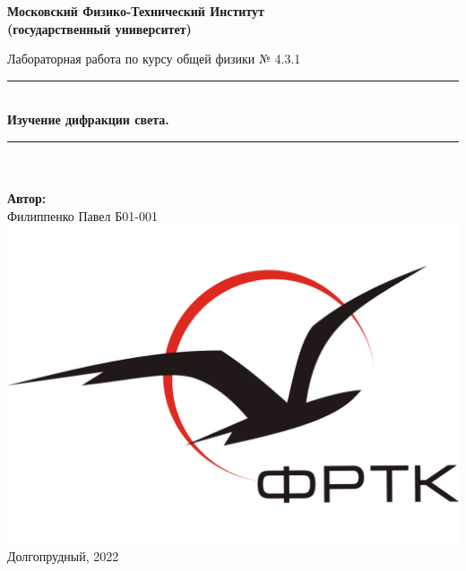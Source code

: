 \newcommand{\HRule}{\rule{\linewidth}{0.7mm}} %
	
	\begin{center}
		\large\textbf{Московский Физико-Технический Институт}\\ %
		\large\textbf{(государственный университет)}
	
		\vfill
		
		\Large Лабораторная работа по курсу общей физики № 4.3.1\\[0.5cm] %
		
		
		\HRule
		\\[0.4cm]
		{ \huge \bfseries Изучение дифракции света.}%
		\\[0.4cm] 
		\HRule
		\\[0.5cm]
		
		\ \\
	\textbf{\large Автор:} \\	
	\large Филиппенко Павел Б01-001\\ %
		\vfill
		\hspace*{-0.8 cm}\includegraphics[width=100 pt]{../images/frkt_logo}\\ %
		\large Долгопрудный, 2022 %
	\end{center}

\newpage
\setcounter{page}{2}
\fancyfoot[c]{\thepage}
\fancyhead[R]{}
